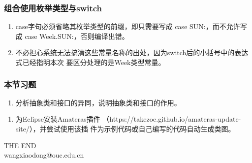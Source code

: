\begin{frame}[fragile] %
\frametitle{组合使用枚举类型与switch}


\pause


\begin{enumerate}
\item case字句必须省略其枚举类型的前缀，即只需要写成 case SUN:，而不允许写成 case
  Week.SUN:，否则编译出错。
\item 不必担心系统无法搞清这些常量名称的出处，因为switch后的小括号中的表达式已经指明本次
  要区分处理的是Week类型常量。
\end{enumerate}
\end{frame}

\begin{frame}[fragile]
  \frametitle{本节习题}

  \begin{enumerate}
  \item 分析抽象类和接口的异同，说明抽象类和接口的作用。
  \end{enumerate}

  \begin{enumerate}
  \item 为Eclipse安装Amateras插件
    （https://takezoe.github.io/amateras-update-site/），并尝试使用该插
    件为示例代码或自己编写的代码自动生成类图。
  \end{enumerate}

\end{frame}



\begin{frame}[focus]
\centering
{\Huge {THE END}} \\
\vspace{5mm}
{\Large wangxiaodong@ouc.edu.cn} \\
\end{frame}

